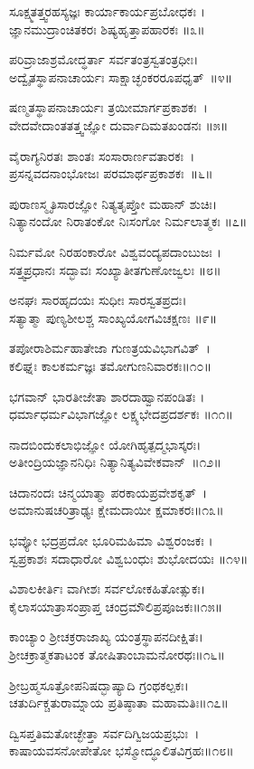 ಸೂಕ್ಷ್ಮತತ್ತ್ವರಹಸ್ಯಜ್ಞಃ ಕಾರ್ಯಾಕಾರ್ಯಪ್ರಬೋಧಕಃ ।\\
ಜ್ಞಾನಮುದ್ರಾಂಚಿತಕರಃ  ಶಿಷ್ಯಹೃತ್ತಾಪಹಾರಕಃ ॥೩॥

ಪರಿವ್ರಾಜಾಶ್ರಮೋದ್ಧರ್ತಾ  ಸರ್ವತಂತ್ರಸ್ವತಂತ್ರಧೀಃ।\\
ಅದ್ವೈತಸ್ಥಾಪನಾಚಾರ್ಯಃ ಸಾಕ್ಷಾಚ್ಛಂಕರರೂಪಧೃತ್~॥೪॥
 
ಷಣ್ಮತಸ್ಥಾಪನಾಚಾರ್ಯಃ  ತ್ರಯೀಮಾರ್ಗಪ್ರಕಾಶಕಃ~।\\
ವೇದವೇದಾಂತತತ್ತ್ವಜ್ಞೋ ದುರ್ವಾದಿಮತಖಂಡನಃ ॥೫॥

ವೈರಾಗ್ಯನಿರತಃ ಶಾಂತಃ ಸಂಸಾರಾರ್ಣವತಾರಕಃ~।\\
ಪ್ರಸನ್ನವದನಾಂಭೋಜಃ ಪರಮಾರ್ಥಪ್ರಕಾಶಕಃ~॥೬॥

ಪುರಾಣಸ್ಮೃತಿಸಾರಜ್ಞೋ ನಿತ್ಯತೃಪ್ತೋ ಮಹಾನ್ ಶುಚಿಃ।\\
ನಿತ್ಯಾನಂದೋ ನಿರಾತಂಕೋ ನಿಃಸಂಗೋ ನಿರ್ಮಲಾತ್ಮಕಃ ॥೭॥

ನಿರ್ಮಮೋ ನಿರಹಂಕಾರೋ ವಿಶ್ವವಂದ್ಯಪದಾಂಬುಜಃ ।\\
ಸತ್ತ್ವಪ್ರಧಾನಃ ಸದ್ಭಾವಃ ಸಂಖ್ಯಾತೀತಗುಣೋಜ್ವಲಃ ॥೮॥

ಅನಘಃ ಸಾರಹೃದಯಃ ಸುಧೀಃ ಸಾರಸ್ವತಪ್ರದಃ।\\
ಸತ್ಯಾತ್ಮಾ ಪುಣ್ಯಶೀಲಶ್ಚ ಸಾಂಖ್ಯಯೋಗವಿಚಕ್ಷಣಃ ॥೯॥

ತಪೋರಾಶಿರ್ಮಹಾತೇಜಾ ಗುಣತ್ರಯವಿಭಾಗವಿತ್~।\\
ಕಲಿಘ್ನಃ ಕಾಲಕರ್ಮಜ್ಞಃ ತಮೋಗುಣನಿವಾರಕಃ॥೧೦॥

ಭಗವಾನ್ ಭಾರತೀಜೇತಾ ಶಾರದಾಹ್ವಾನಪಂಡಿತಃ ।\\
ಧರ್ಮಾಧರ್ಮವಿಭಾಗಜ್ಞೋ ಲಕ್ಷ್ಯಭೇದಪ್ರದರ್ಶಕಃ ॥೧೧॥

ನಾದಬಿಂದುಕಲಾಭಿಜ್ಞೋ ಯೋಗಿಹೃತ್ಪದ್ಮಭಾಸ್ಕರಃ।\\
ಅತೀಂದ್ರಿಯಜ್ಞಾನನಿಧಿಃ ನಿತ್ಯಾನಿತ್ಯವಿವೇಕವಾನ್~॥೧೨॥

ಚಿದಾನಂದಃ ಚಿನ್ಮಯಾತ್ಮಾ ಪರಕಾಯಪ್ರವೇಶಕೃತ್~।\\
ಅಮಾನುಷಚರಿತ್ರಾಢ್ಯಃ ಕ್ಷೇಮದಾಯೀ ಕ್ಷಮಾಕರಃ॥೧೩॥

ಭವ್ಯೋ ಭದ್ರಪ್ರದೋ ಭೂರಿಮಹಿಮಾ ವಿಶ್ವರಂಜಕಃ ।\\
ಸ್ವಪ್ರಕಾಶಃ ಸದಾಧಾರೋ  ವಿಶ್ವಬಂಧುಃ ಶುಭೋದಯಃ ॥೧೪॥

ವಿಶಾಲಕೀರ್ತಿಃ ವಾಗೀಶಃ ಸರ್ವಲೋಕಹಿತೋತ್ಸುಕಃ।\\
ಕೈಲಾಸಯಾತ್ರಾಸಂಪ್ರಾಪ್ತ ಚಂದ್ರಮೌಲಿಪ್ರಪೂಜಕಃ॥೧೫॥
 
ಕಾಂಚ್ಯಾಂ ಶ್ರೀಚಕ್ರರಾಜಾಖ್ಯ ಯಂತ್ರಸ್ಥಾಪನದೀಕ್ಷಿತಃ।\\
 ಶ್ರೀಚಕ್ರಾತ್ಮಕತಾಟಂಕ ತೋಷಿತಾಂಬಾಮನೋರಥಃ॥೧೬॥

 ಶ್ರೀಬ್ರಹ್ಮಸೂತ್ರೋಪನಿಷದ್ಭಾಷ್ಯಾದಿ ಗ್ರಂಥಕಲ್ಪಕಃ।\\
ಚತುರ್ದಿಕ್ಚತುರಾಮ್ನಾಯ ಪ್ರತಿಷ್ಠಾತಾ ಮಹಾಮತಿಃ॥೧೭॥

ದ್ವಿಸಪ್ತತಿಮತೋಚ್ಛೇತ್ತಾ ಸರ್ವದಿಗ್ವಿಜಯಪ್ರಭುಃ~।\\
ಕಾಷಾಯವಸನೋಪೇತೋ ಭಸ್ಮೋದ್ಧೂಲಿತವಿಗ್ರಹಃ॥೧೮॥

